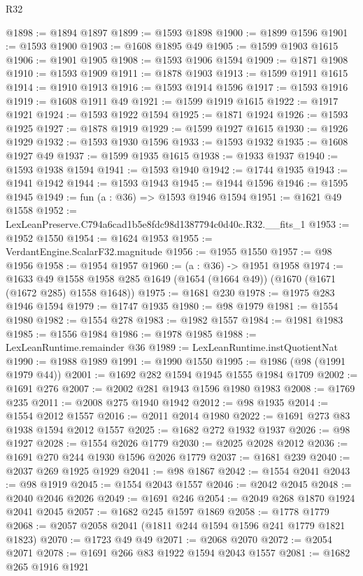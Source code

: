 \begin{lexlean}{R32}
\begin{coremodule}
@1898 := @1894 @1897
@1899 := @1593 @1898
@1900 := @1899 @1596
@1901 := @1593 @1900
@1903 := @1608 @1895 @49
@1905 := @1599 @1903 @1615
@1906 := @1901 @1905
@1908 := @1593 @1906 @1594
@1909 := @1871 @1908
@1910 := @1593 @1909
@1911 := @1878 @1903
@1913 := @1599 @1911 @1615
@1914 := @1910 @1913
@1916 := @1593 @1914 @1596
@1917 := @1593 @1916
@1919 := @1608 @1911 @49
@1921 := @1599 @1919 @1615
@1922 := @1917 @1921
@1924 := @1593 @1922 @1594
@1925 := @1871 @1924
@1926 := @1593 @1925
@1927 := @1878 @1919
@1929 := @1599 @1927 @1615
@1930 := @1926 @1929
@1932 := @1593 @1930 @1596
@1933 := @1593 @1932
@1935 := @1608 @1927 @49
@1937 := @1599 @1935 @1615
@1938 := @1933 @1937
@1940 := @1593 @1938 @1594
@1941 := @1593 @1940
@1942 := @1744 @1935
@1943 := @1941 @1942
@1944 := @1593 @1943
@1945 := @1944 @1596
@1946 := @1595 @1945
@1949 := fun (a : @36) => @1593 @1946 @1594
@1951 := @1621 @49 @1558
@1952 := LexLeanPreserve.C794a6cad1b5e8fdc98d1387794c0d40c.R32.__fits_1
@1953 := @1952 @1550
@1954 := @1624 @1953
@1955 := VerdantEngine.ScalarF32.magnitude
@1956 := @1955 @1550
@1957 := @98 @1956
@1958 := @1954 @1957
@1960 := (a : @36) -> @1951 @1958
@1974 := @1633
    @49
    @1558
    @1958
    @285
    @1649
    (@1654 (@1664 @49))
    (@1670 (@1671 (@1672 @285) @1558 @1648))
@1975 := @1681 @230
@1978 := @1975 @283 @1946 @1594
@1979 := @1747 @1935
@1980 := @98 @1979
@1981 := @1554 @1980
@1982 := @1554 @278
@1983 := @1982 @1557
@1984 := @1981 @1983
@1985 := @1556 @1984
@1986 := @1978 @1985
@1988 := LexLeanRuntime.remainder @36
@1989 := LexLeanRuntime.instQuotientNat
@1990 := @1988 @1989
@1991 := @1990 @1550
@1995 := @1986 (@98 (@1991 @1979 @44))
@2001 := @1692 @282 @1594 @1945 @1555 @1984 @1709
@2002 := @1691 @276
@2007 := @2002 @281 @1943 @1596 @1980 @1983
@2008 := @1769 @235
@2011 := @2008 @275 @1940 @1942
@2012 := @98 @1935
@2014 := @1554 @2012 @1557
@2016 := @2011 @2014 @1980
@2022 := @1691 @273 @83 @1938 @1594 @2012 @1557
@2025 := @1682 @272 @1932 @1937
@2026 := @98 @1927
@2028 := @1554 @2026 @1779
@2030 := @2025 @2028 @2012
@2036 := @1691 @270 @244 @1930 @1596 @2026 @1779
@2037 := @1681 @239
@2040 := @2037 @269 @1925 @1929
@2041 := @98 @1867
@2042 := @1554 @2041
@2043 := @98 @1919
@2045 := @1554 @2043 @1557
@2046 := @2042 @2045
@2048 := @2040 @2046 @2026
@2049 := @1691 @246
@2054 := @2049 @268 @1870 @1924 @2041 @2045
@2057 := @1682 @245 @1597 @1869
@2058 := @1778 @1779
@2068 := @2057 @2058 @2041 (@1811 @244 @1594 @1596 @241 @1779 @1821 @1823)
@2070 := @1723 @49 @49
@2071 := @2068 @2070
@2072 := @2054 @2071
@2078 := @1691 @266 @83 @1922 @1594 @2043 @1557
@2081 := @1682 @265 @1916 @1921

\end{coremodule}
\end{lexlean}
